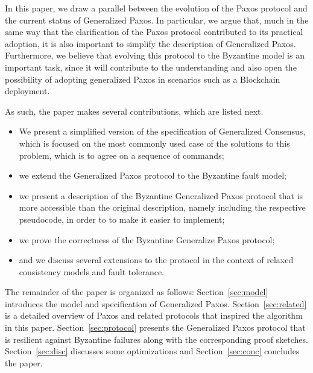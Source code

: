 
In this paper, we draw a parallel between the evolution of the Paxos
protocol and the current status of Generalized Paxos. In particular,
we argue that, much in the same way that the clarification of the Paxos
protocol contributed to its practical adoption, it is also important
to simplify the description of Generalized Paxos. Furthermore, we believe
that evolving this protocol to the Byzantine model is an important
task, since it will contribute to the understanding
and also open the possibility of adopting generalized Paxos in
scenarios such as a Blockchain deployment.

As such, the paper makes several contributions, which are listed next.
%
\begin{itemize}
\item
We present a simplified version of the specification of Generalized
Consensus, which is focused on the most commonly used case of the
solutions to this problem, which is to agree on a sequence of
commands;

\item
we extend the Generalized Paxos protocol to the Byzantine fault model; 

\item
we present a description of the Byzantine Generalized Paxos protocol
that is more accessible than the original description, namely including the
respective pseudocode, in order to to make it 
easier to implement;

\item
we prove the correctness of the Byzantine Generalize Paxos protocol;

\item
and we discuss several extensions to the protocol in the context of relaxed consistency models and fault tolerance.


\end{itemize}

The remainder of the paper is organized as follows: Section~\ref{sec:model} introduces the model and specification of Generalized Paxos.
Section~\ref{sec:related} is a detailed overview of Paxos and related protocols that inspired the algorithm in this paper.
Section~\ref{sec:protocol} presents the Generalized Paxos protocol that is resilient against Byzantine failures along with the corresponding proof sketches. 
Section~\ref{sec:disc} discusses some optimizations and Section~\ref{sec:conc} concludes the paper.
